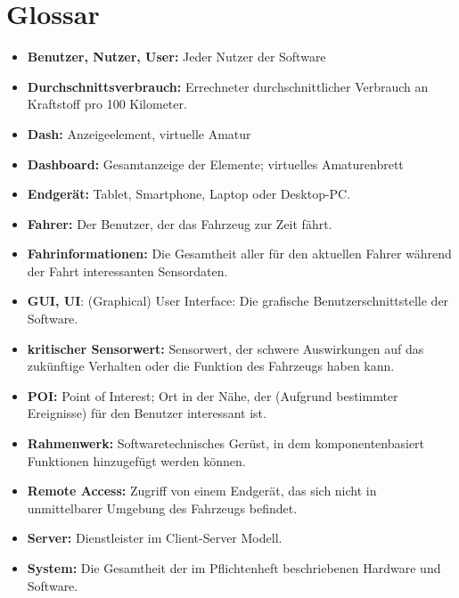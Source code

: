 \documentclass[pflichtenheft.tex]{subfiles}
\begin{document}
\chapter{Glossar}

\begin{itemize}

\item
\textbf{Benutzer, Nutzer, User:} Jeder Nutzer der Software

\item
\textbf{Durchschnittsverbrauch:} Errechneter durchschnittlicher Verbrauch an Kraftstoff pro 100 Kilometer.

\item
\textbf{Dash: } Anzeigeelement, virtuelle Amatur

\item
\textbf{Dashboard: } Gesamtanzeige der Elemente; virtuelles Amaturenbrett

\item
\textbf{Endgerät:} Tablet, Smartphone, Laptop oder Desktop-PC.

\item
\textbf{Fahrer:} Der Benutzer, der das Fahrzeug zur Zeit fährt.

\item
\textbf{Fahrinformationen:} Die Gesamtheit aller für den aktuellen Fahrer während der Fahrt interessanten Sensordaten.

\item
\textbf{GUI, UI}: (Graphical) User Interface: Die grafische Benutzerschnittstelle der Software.

\item
\textbf{kritischer Sensorwert:} Sensorwert, der schwere Auswirkungen auf das zukünftige Verhalten oder die Funktion des Fahrzeugs haben kann.

\item
\textbf{POI:} Point of Interest; Ort in der Nähe, der (Aufgrund bestimmter Ereignisse) für den Benutzer interessant ist.

\item
\textbf{Rahmenwerk: } Softwaretechnisches Gerüst, in dem komponentenbasiert Funktionen hinzugefügt werden können. 

\item
\textbf{Remote Access:} Zugriff von einem Endgerät, das sich nicht in unmittelbarer Umgebung des Fahrzeugs befindet.

\item
\textbf{Server:} Dienstleister im Client-Server Modell.

\item
\textbf{System:} Die Gesamtheit der im Pflichtenheft beschriebenen Hardware und Software.

\end{itemize}
\end{document}
